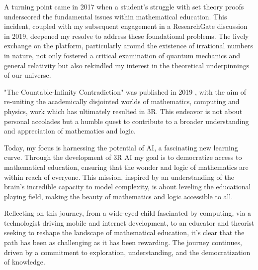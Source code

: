 \documentclass[12pt]{article}
\begin{document}
A turning point came in 2017 when a student's struggle with set theory proofs underscored the fundamental issues within mathematical education. This incident, coupled with my subsequent engagement in a ResearchGate discussion in 2019, deepened my resolve to address these foundational problems. The lively exchange on the platform, particularly around the existence of irrational numbers in nature, not only fostered a critical examination of quantum mechanics and general relativity but also rekindled my interest in the theoretical underpinnings of our universe.

"The Countable-Infinity Contradiction" was published in 2019 \cite{darnell2019countable}, with the aim of re-uniting the academically disjointed worlds of mathematics, computing and physics, work which has ultimately resulted in 3R. This endeavor is not about personal accolades but a humble quest to contribute to a broader understanding and appreciation of mathematics and logic.

Today, my focus is harnessing the potential of AI, a fascinating new learning curve. Through the development of 3R AI my goal is to democratize access to mathematical education, ensuring that the wonder and logic of mathematics are within reach of everyone. This mission, inspired by an understanding of the brain's incredible capacity to model complexity, is about leveling the educational playing field, making the beauty of mathematics and logic accessible to all.

Reflecting on this journey, from a wide-eyed child fascinated by computing, via a technologist driving mobile and internet development, to an educator and theorist seeking to reshape the landscape of mathematical education, it's clear that the path has been as challenging as it has been rewarding. The journey continues, driven by a commitment to exploration, understanding, and the democratization of knowledge.


\end{document}
